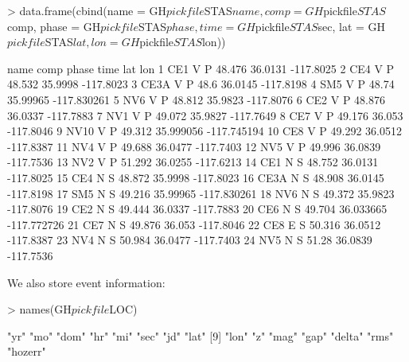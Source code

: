 \documentclass{article}
\begin{document}
\begin{Schunk}
\begin{Sinput}
> data.frame(cbind(name = GH$pickfile$STAS$name, comp = GH$pickfile$STAS$comp, 
     phase = GH$pickfile$STAS$phase, time = GH$pickfile$STAS$sec, 
     lat = GH$pickfile$STAS$lat, lon = GH$pickfile$STAS$lon))
\end{Sinput}
\begin{Soutput}
   name comp phase   time       lat         lon
1   CE1    V     P 48.476   36.0131   -117.8025
2   CE4    V     P 48.532   35.9998   -117.8023
3  CE3A    V     P   48.6   36.0145   -117.8198
4   SM5    V     P  48.74  35.99965 -117.830261
5   NV6    V     P 48.812   35.9823   -117.8076
6   CE2    V     P 48.876   36.0337   -117.7883
7   NV1    V     P 49.072   35.9827   -117.7649
8   CE7    V     P 49.176    36.053   -117.8046
9  NV10    V     P 49.312 35.999056 -117.745194
10  CE8    V     P 49.292   36.0512   -117.8387
11  NV4    V     P 49.688   36.0477   -117.7403
12  NV5    V     P 49.996   36.0839   -117.7536
13  NV2    V     P 51.292   36.0255   -117.6213
14  CE1    N     S 48.752   36.0131   -117.8025
15  CE4    N     S 48.872   35.9998   -117.8023
16 CE3A    N     S 48.908   36.0145   -117.8198
17  SM5    N     S 49.216  35.99965 -117.830261
18  NV6    N     S 49.372   35.9823   -117.8076
19  CE2    N     S 49.444   36.0337   -117.7883
20  CE6    N     S 49.704 36.033665 -117.772726
21  CE7    N     S 49.876    36.053   -117.8046
22  CE8    E     S 50.316   36.0512   -117.8387
23  NV4    N     S 50.984   36.0477   -117.7403
24  NV5    N     S  51.28   36.0839   -117.7536
\end{Soutput}
\end{Schunk}
We also store event information:
\begin{Schunk}
\begin{Sinput}
> names(GH$pickfile$LOC)
\end{Sinput}
\begin{Soutput}
 [1] "yr"     "mo"     "dom"    "hr"     "mi"     "sec"    "jd"     "lat"   
 [9] "lon"    "z"      "mag"    "gap"    "delta"  "rms"    "hozerr"
\end{Soutput}
\end{Schunk}
\end{document}
